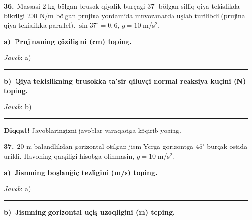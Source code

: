 \documentclass[11pt,a4paper]{article}
\newcommand{\blank}{\rule{5cm}{0.4pt}}
\begin{document}
\noindent{}\par\vspace{14pt}
\noindent\textbf{36.}\ Massasi 2 kg bölgan brusok qiyalik burçagi $37^\circ$ bölgan silliq qiya tekislikda bikrligi 200 N/m bölgan prujina yordamida muvozanatda uşlab turilibdi (prujina qiya tekislikka parallel). $\sin37^\circ=0{,}6$, $g=10$ m/s$^2$.\par\smallskip
\medskip\noindent\textbf{a)\ Prujinaning çözilişini (cm) toping.}\par
\noindent\textit{Javob}: a)\ \blank\par
\medskip\noindent\textbf{b)\ Qiya tekislikning brusokka ta’sir qiluvçi normal reaksiya kuçini (N) toping.}\par
\noindent\textit{Javob}: b)\ \blank\par
\medskip\noindent\textbf{Diqqat!} Javoblaringizni javoblar varaqasiga köçirib yozing.\par\vspace{10pt}
\noindent\textbf{37.}\ 20 m balandlikdan gorizontal otilgan jism Yerga gorizontga $45^\circ$ burçak ostida urildi. Havoning qarşiligi hisobga olinmasin, $g=10$ m/s$^2$.\par\smallskip
\medskip\noindent\textbf{a)\ Jismning boşlanğiç tezligini (m/s) toping.}\par
\noindent\textit{Javob}: a)\ \blank\par
\medskip\noindent\textbf{b)\ Jismning gorizontal uçiş uzoqligini (m) toping.}\par
\end{document}
